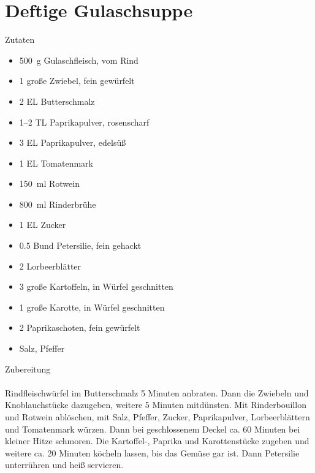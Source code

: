 \section*{Deftige Gulaschsuppe}
\ihead{}\ohead{}
\cfoot{}
{\Large Zutaten}
\begin{multicols}{2}
\begin{itemize}
    \item \SI{500}{g} Gulaschfleisch, vom Rind
    \item \num{1} große Zwiebel, fein gewürfelt
    \item \num{2} EL Butterschmalz
    \item \numrange{1}{2} TL Paprikapulver, rosenscharf
    \item \num{3} EL Paprikapulver, edelsüß
    \item \num{1} EL Tomatenmark
    \item \SI{150}{ml} Rotwein
    \item \SI{800}{ml} Rinderbrühe
    \item \num{1} EL Zucker
    \item \num{0,5} Bund Petersilie, fein gehackt
    \item \num{2} Lorbeerblätter
    \item \num{3} große Kartoffeln, in Würfel geschnitten
    \item \num{1} große Karotte, in Würfel geschnitten
    \item \num{2} Paprikaschoten, fein gewürfelt
    \item Salz, Pfeffer
\end{itemize}
\end{multicols}
\noindent
{\Large Zubereitung}\\
\\
Rindfleischwürfel im Butterschmalz 5 Minuten anbraten.
Dann die Zwiebeln und Knoblauchstücke dazugeben, weitere 5 Minuten mitdünsten.
Mit Rinderbouillon und Rotwein ablöschen, mit Salz, Pfeffer, Zucker, Paprikapulver, Lorbeerblättern und Tomatenmark würzen.
Dann bei geschlossenem Deckel ca. 60 Minuten bei kleiner Hitze schmoren.
Die Kartoffel-, Paprika und Karottenstücke zugeben und weitere ca. 20 Minuten köcheln lassen, bis das Gemüse gar ist.
Dann Petersilie unterrühren und heiß servieren.

